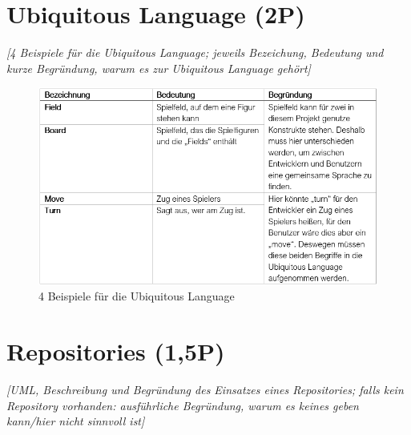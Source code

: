 \section{Ubiquitous Language (2P)}
\emph{[4 Beispiele für die Ubiquitous Language; jeweils Bezeichung, Bedeutung und kurze Begründung,
warum es zur Ubiquitous Language gehört]}

\begin{figure}[htbp]
\centering
\centerline{\includegraphics[scale=.7]{ubiquitous}}
\caption{4 Beispiele für die Ubiquitous Language}
\label{fig:ubiquitous}
\end{figure}



\section{Repositories (1,5P)}
\emph{[UML, Beschreibung und Begründung des Einsatzes eines Repositories; falls kein Repository
vorhanden: ausführliche Begründung, warum es keines geben kann/hier nicht sinnvoll ist]}

